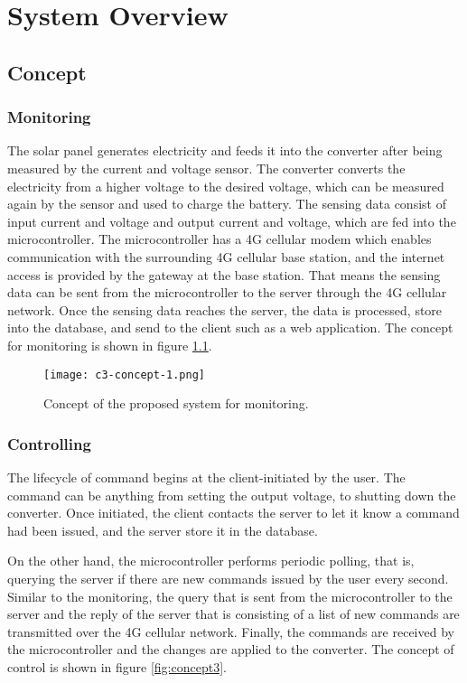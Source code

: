 \documentclass[../thesis.tex]{subfiles}
\begin{document}
\chapter{System Overview}
\label{chap:syso}

\section{Concept}


\subsection{Monitoring}
The solar panel generates electricity and feeds it into the converter after being measured by the current and voltage sensor. The converter converts the electricity from a higher voltage to the desired voltage, which can be measured again by the sensor and used to charge the battery. The sensing data consist of input current and voltage and output current and voltage, which are fed into the microcontroller. The microcontroller has a 4G cellular modem which enables communication with the surrounding 4G cellular base station, and the internet access is provided by the gateway at the base station. That means the sensing data can be sent from the microcontroller to the server through the 4G cellular network. Once the sensing data reaches the server, the data is processed, store into the database, and send to the client such as a web application. The concept for monitoring is shown in figure \ref{fig:concept1}.

\begin{figure}[!ht]
\texttt{[image: c3-concept-1.png]}
\caption{Concept of the proposed system for monitoring.}
\label{fig:concept1}
\end{figure}


\newpage
\subsection{Controlling}
The lifecycle of command begins at the client-initiated by the user. The command can be anything from setting the output voltage, to shutting down the converter. Once initiated, the client contacts the server to let it know a command had been issued, and the server store it in the database.

On the other hand, the microcontroller performs periodic polling, that is, querying the server if there are new commands issued by the user every second. Similar to the monitoring, the query that is sent from the microcontroller to the server and the reply of the server that is consisting of a list of new commands are transmitted over the 4G cellular network. Finally, the commands are received by the microcontroller and the changes are applied to the converter. The concept of control is shown in figure \ref{fig:concept3}.
\end{document}
